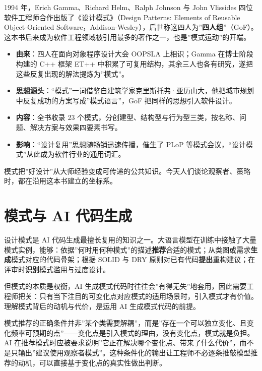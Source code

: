\documentclass[
]{ctexbook}
\providecommand{\tightlist}{\setlength{\itemsep}{0pt}\setlength{\parskip}{0pt} }
\begin{document}
1994 年，Erich Gamma、Richard Helm、Ralph Johnson 与 John Vlissides
四位软件工程师合作出版了《设计模式》（Design Patterns: Elements of
Reusable Object-Oriented
Software，Addison-Wesley），后世称这四人为''\textbf{四人组}''（GoF）。这本书后来成为软件工程领域被引用最多的著作之一，也是''模式运动''的开端。

\begin{itemize}
\tightlist
\item
  \textbf{由来}：四人在面向对象程序设计大会 OOPSLA 上相识；Gamma
  在博士阶段构建的 C++ 框架 ET++
  中积累了可复用结构，其余三人也各有研究，遂把这些反复出现的解法提炼为''模式''。
\item
  \textbf{思想源头}：``模式''一词借鉴自建筑学家克里斯托弗·亚历山大，他把城市规划中反复成功的方案写成''模式语言''，GoF
  把同样的思想引入软件设计。
\item
  \textbf{内容}：全书收录 23
  个模式，分创建型、结构型与行为型三类，按名称、问题、解决方案与效果四要素书写。
\item
  \textbf{影响}：``设计复用''思想随畅销迅速传播，催生了 PLoP
  等模式会议，``设计模式''从此成为软件行业的通用词汇。
\end{itemize}

模式把''好设计''从大师经验变成可传递的公共知识。今天人们谈论观察者、策略时，都在沿用这本书建立的坐标系。

\section{模式与 AI
代码生成}\label{ux6a21ux5f0fux4e0e-ai-ux4ee3ux7801ux751fux6210}

设计模式是 AI
代码生成最擅长复用的知识之一。大语言模型在训练中接触了大量模式实例，能够：依据''何时用何种模式''的描述\textbf{推荐}合适的模式；从类图或需求\textbf{生成}模式对应的代码骨架；根据
SOLID 与 DRY
原则对已有代码\textbf{提出}重构建议；在评审时\textbf{识别}模式滥用与过度设计。

但模式的本质是权衡，AI
生成模式代码时往往会''有得无失''地套用，因此需要工程师把关：只有当下注目的可变化点对应模式的适用场景时，引入模式才有价值。理解模式背后的动机与代价，是运用
AI 生成模式代码的前提。

模式推荐的正确条件并非''某个类需要解耦''，而是''存在一个可以独立变化、且变化频率可预期的点''------变化点是引入模式的理由，没有变化点，模式就是负担。AI
在推荐模式时应被要求说明''它正在解决哪个变化点、带来了什么代价''，而不是只输出''建议使用观察者模式''。这种条件化的输出让工程师不必逐条推敲模型推荐的动机，可以直接基于变化点的真实性做出判断。
\end{document}
